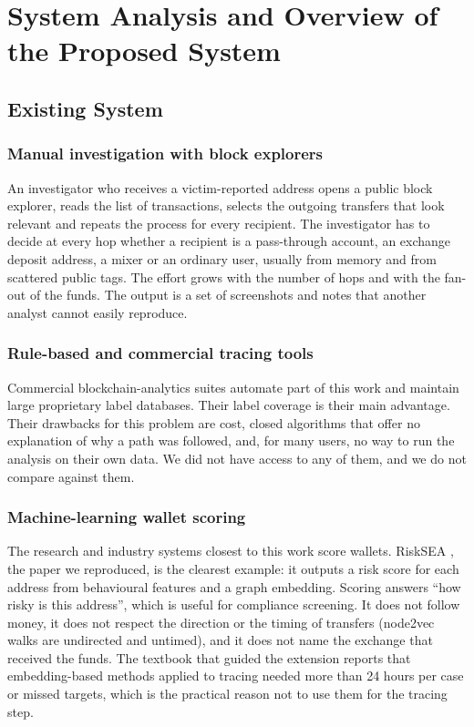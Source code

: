 \chapter{System Analysis and Overview of the Proposed System}
\label{ch:analysis}

\section{Existing System}
\subsection{Manual investigation with block explorers}
An investigator who receives a victim-reported address opens a public block explorer, reads the list of transactions, selects the outgoing transfers that look relevant and repeats the process for every recipient. The investigator has to decide at every hop whether a recipient is a pass-through account, an exchange deposit address, a mixer or an ordinary user, usually from memory and from scattered public tags. The effort grows with the number of hops and with the fan-out of the funds. The output is a set of screenshots and notes that another analyst cannot easily reproduce.

\subsection{Rule-based and commercial tracing tools}
Commercial blockchain-analytics suites automate part of this work and maintain large proprietary label databases. Their label coverage is their main advantage. Their drawbacks for this problem are cost, closed algorithms that offer no explanation of why a path was followed, and, for many users, no way to run the analysis on their own data. We did not have access to any of them, and we do not compare against them.

\subsection{Machine-learning wallet scoring}
The research and industry systems closest to this work score wallets. RiskSEA \cite{risksea}, the paper we reproduced, is the clearest example: it outputs a risk score for each address from behavioural features and a graph embedding. Scoring answers ``how risky is this address'', which is useful for compliance screening. It does not follow money, it does not respect the direction or the timing of transfers (node2vec walks are undirected and untimed), and it does not name the exchange that received the funds. The textbook that guided the extension \cite{textbook} reports that embedding-based methods applied to tracing needed more than 24 hours per case or missed targets, which is the practical reason not to use them for the tracing step.

